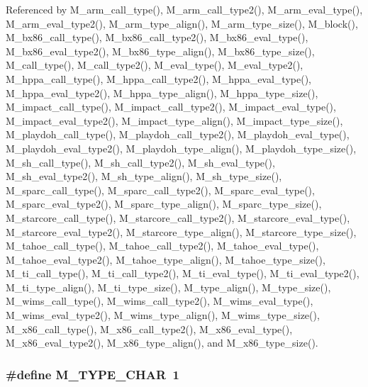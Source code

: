Referenced by M\_\-arm\_\-call\_\-type(), M\_\-arm\_\-call\_\-type2(), M\_\-arm\_\-eval\_\-type(), M\_\-arm\_\-eval\_\-type2(), M\_\-arm\_\-type\_\-align(), M\_\-arm\_\-type\_\-size(), M\_\-block(), M\_\-bx86\_\-call\_\-type(), M\_\-bx86\_\-call\_\-type2(), M\_\-bx86\_\-eval\_\-type(), M\_\-bx86\_\-eval\_\-type2(), M\_\-bx86\_\-type\_\-align(), M\_\-bx86\_\-type\_\-size(), M\_\-call\_\-type(), M\_\-call\_\-type2(), M\_\-eval\_\-type(), M\_\-eval\_\-type2(), M\_\-hppa\_\-call\_\-type(), M\_\-hppa\_\-call\_\-type2(), M\_\-hppa\_\-eval\_\-type(), M\_\-hppa\_\-eval\_\-type2(), M\_\-hppa\_\-type\_\-align(), M\_\-hppa\_\-type\_\-size(), M\_\-impact\_\-call\_\-type(), M\_\-impact\_\-call\_\-type2(), M\_\-impact\_\-eval\_\-type(), M\_\-impact\_\-eval\_\-type2(), M\_\-impact\_\-type\_\-align(), M\_\-impact\_\-type\_\-size(), M\_\-playdoh\_\-call\_\-type(), M\_\-playdoh\_\-call\_\-type2(), M\_\-playdoh\_\-eval\_\-type(), M\_\-playdoh\_\-eval\_\-type2(), M\_\-playdoh\_\-type\_\-align(), M\_\-playdoh\_\-type\_\-size(), M\_\-sh\_\-call\_\-type(), M\_\-sh\_\-call\_\-type2(), M\_\-sh\_\-eval\_\-type(), M\_\-sh\_\-eval\_\-type2(), M\_\-sh\_\-type\_\-align(), M\_\-sh\_\-type\_\-size(), M\_\-sparc\_\-call\_\-type(), M\_\-sparc\_\-call\_\-type2(), M\_\-sparc\_\-eval\_\-type(), M\_\-sparc\_\-eval\_\-type2(), M\_\-sparc\_\-type\_\-align(), M\_\-sparc\_\-type\_\-size(), M\_\-starcore\_\-call\_\-type(), M\_\-starcore\_\-call\_\-type2(), M\_\-starcore\_\-eval\_\-type(), M\_\-starcore\_\-eval\_\-type2(), M\_\-starcore\_\-type\_\-align(), M\_\-starcore\_\-type\_\-size(), M\_\-tahoe\_\-call\_\-type(), M\_\-tahoe\_\-call\_\-type2(), M\_\-tahoe\_\-eval\_\-type(), M\_\-tahoe\_\-eval\_\-type2(), M\_\-tahoe\_\-type\_\-align(), M\_\-tahoe\_\-type\_\-size(), M\_\-ti\_\-call\_\-type(), M\_\-ti\_\-call\_\-type2(), M\_\-ti\_\-eval\_\-type(), M\_\-ti\_\-eval\_\-type2(), M\_\-ti\_\-type\_\-align(), M\_\-ti\_\-type\_\-size(), M\_\-type\_\-align(), M\_\-type\_\-size(), M\_\-wims\_\-call\_\-type(), M\_\-wims\_\-call\_\-type2(), M\_\-wims\_\-eval\_\-type(), M\_\-wims\_\-eval\_\-type2(), M\_\-wims\_\-type\_\-align(), M\_\-wims\_\-type\_\-size(), M\_\-x86\_\-call\_\-type(), M\_\-x86\_\-call\_\-type2(), M\_\-x86\_\-eval\_\-type(), M\_\-x86\_\-eval\_\-type2(), M\_\-x86\_\-type\_\-align(), and M\_\-x86\_\-type\_\-size().
\subsubsection{\setlength{\rightskip}{0pt plus 5cm}\#define M\_\-TYPE\_\-CHAR~1}\label{m__spec_8h_27c3c9ff1df5e3fa3a12bde3cb29f38e}




